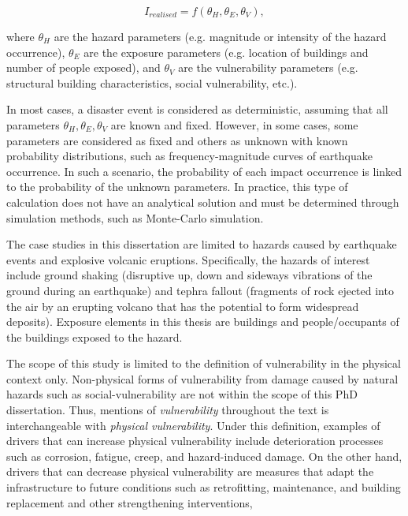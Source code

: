     \begin{equation}
    I_{realised} = f \left( \theta_H, \theta_E, \theta_V \right),
    \end{equation}

where $\theta_H$ are the hazard parameters (e.g. magnitude or intensity of the hazard occurrence), $\theta_E$ are the exposure parameters (e.g. location of buildings and number of people exposed), and $\theta_V$ are the vulnerability parameters (e.g. structural building characteristics, social vulnerability, etc.).

In most cases, a disaster event is considered as deterministic, assuming that all parameters $\theta_H, \theta_E, \theta_V$ are known and fixed. However, in some cases, some parameters are considered as fixed and others as unknown with known probability distributions, such as frequency-magnitude curves of earthquake occurrence. In such a scenario, the probability of each impact occurrence is linked to the probability of the unknown parameters. In practice, this type of calculation does not have an analytical solution and must be determined through simulation methods, such as Monte-Carlo simulation.

The case studies in this dissertation are limited to hazards caused by earthquake events and explosive volcanic eruptions. Specifically, the hazards of interest include ground shaking (disruptive up, down and sideways vibrations of the ground during an earthquake) and tephra fallout (fragments of rock ejected into the air by an erupting volcano that has the potential to form widespread deposits). Exposure elements in this thesis are buildings and people/occupants of the buildings exposed to the hazard.

The scope of this study is limited to the definition of vulnerability in the physical context only. Non-physical forms of vulnerability from damage caused by natural hazards such as social-vulnerability are not within the scope of this PhD dissertation. Thus, mentions of \textit{vulnerability} throughout the text is interchangeable with \textit{physical vulnerability}. Under this definition, examples of drivers that can increase physical vulnerability include deterioration processes such as corrosion, fatigue, creep, and hazard-induced damage. On the other hand, drivers that can decrease physical vulnerability are measures that adapt the infrastructure to future conditions such as retrofitting, maintenance, and building replacement and other strengthening interventions,

